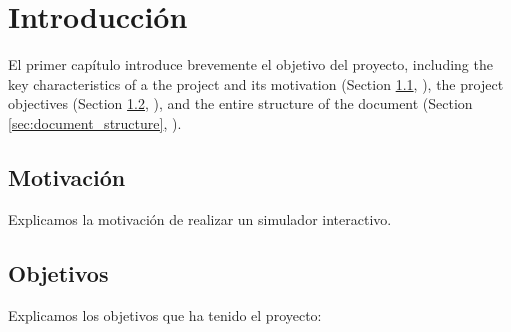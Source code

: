 \chead[]{}
\renewcommand{\headrulewidth}{0.5pt}

\lfoot[]{}
\cfoot[]{}
\rfoot[]{}
\renewcommand{\footrulewidth}{0pt}

\chapter{Introducción}
\label{ch:introduction}

El primer capítulo introduce brevemente el objetivo del proyecto, including the key characteristics of a the project and its motivation (Section \ref{sec:background_and_motivation}, \textit{}), the project objectives (Section \ref{sec:objectives}, \textit{}), and the entire structure of the document (Section \ref{sec:document_structure}, \textit{}).

\section{Motivación}
\label{sec:background_and_motivation}
Explicamos la motivación de realizar un simulador interactivo.



\section{Objetivos}
\label{sec:objectives}

Explicamos los objetivos que ha tenido el proyecto:

